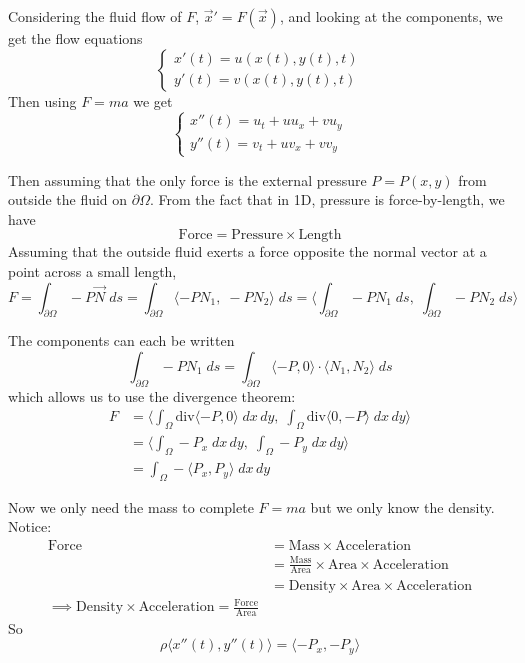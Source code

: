 \documentclass[12pt]{article}
\newcommand{\brak}[1]{\langle #1 \rangle}
\renewcommand{\div}{\text{div}}
\begin{document}
Considering the fluid flow of $F$, $\vec{x}' = F(\vec{x})$, and looking at the components, we get the flow equations
\[\begin{cases}
    x'(t) = u(x(t), y(t), t)\\
    y'(t) = v(x(t), y(t), t)
\end{cases}\]
Then using $F= ma$ we get 
\[\begin{cases}
    x''(t) = u_t + uu_x + vu_y\\
    y''(t) = v_t + uv_x  +vv_y
\end{cases}\]

Then assuming that the only force is the external pressure $P = P(x, y)$ from outside the fluid on $\partial \Omega$. From the fact that in 1D, pressure is force-by-length, we have 
\[\text{Force} = \text{Pressure} \times \text{Length}\]
Assuming that the outside fluid exerts a force opposite the normal vector at a point across a small length, 
\[F = \int_{\partial \Omega} - P\vec{N} \; ds = \int_{\partial \Omega} \brak{-PN_1,\; -PN_2} \; ds = \bigg \langle\int_{\partial \Omega} -PN_1\; ds, \; \int_{\partial \Omega} -PN_2\; ds \bigg \rangle\]

The components can each be written  
\[\int_{\partial \Omega} -PN_1\; ds = \int_{\partial \Omega} \brak{-P, 0} \cdot \brak{N_1, N_2}\; ds\]
which allows us to use the divergence theorem:
\begin{align*}
    F &= \bigg \langle \int_{\Omega} \div\brak{-P, 0}\; dx\, dy, \; \int_{\Omega} \div\brak{0, -P}\; dx\, dy\bigg \rangle\\
    &= \bigg \langle \int_{\Omega} -P_x \; dx\, dy, \; \int_{\Omega} -P_y\; dx\, dy\bigg \rangle\\
    &= \int_{\Omega} -\brak{P_x, P_y}\; dx\, dy
\end{align*}

Now we only need the mass to complete $F= ma$ but we only know the density. Notice:
\begin{align*}
    \text{Force} &= \text{Mass} \times \text{Acceleration}\\
    &= \frac{\text{Mass}}{\text{Area}} \times \text{Area} \times \text{Acceleration}\\
    &= \text{Density}\times \text{Area} \times \text{Acceleration}\\
    \implies \text{Density}\times \text{Acceleration} = \frac{\text{Force}}{\text{Area}}
\end{align*}
So 
\[\rho \brak{x''(t), y''(t)} = \brak{-P_x, -P_y}\]
\end{document}
